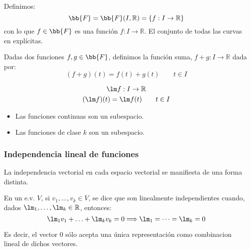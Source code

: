 Definimos:
\begin{equation*}
    \bb{F} = \bb{F}(I, \mathbb{R}) = \{f:I\rightarrow\mathbb{R}\}
\end{equation*}
con lo que $f\in \bb{F}$ es una función $f:I\rightarrow\mathbb{R}$. El conjunto de todas las curvas en explícitas.

\begin{definicion}
    Dadas dos funciones $f,g\in \bb{F}$, definimos la función suma, $f+g:I\rightarrow\mathbb{R}$ dada por:
    \begin{equation*}
        (f+g)(t) = f(t) + g(t) \qquad t\in I
    \end{equation*}
\end{definicion}


\begin{definicion}[]
    \begin{gather*}
        \lm f:I\rightarrow\mathbb{R} \\
        (\lm f)(t) = \lm f(t) \qquad t\in I
    \end{gather*}
\end{definicion}


\begin{prop}
    \begin{itemize}
        \item Las funciones continuas son un subespacio.
        \item Las funciones de clase $k$ son un subespacio.
    \end{itemize}
\end{prop}

\subsubsection{Independencia lineal de funciones}
La independencia vectorial en cada espacio vectorial se manifiesta de una forma distinta.

\begin{definicion}
    En un e.v. $V$, si $v_1,\ldots,v_k \in V$, se dice que son linealmente independientes cuando, dados $\lm_1,\ldots,\lm_k\in \mathbb{R}$, entonces:
    \begin{equation*}
        \lm_1v_1 + \ldots + \lm_k v_k = 0 \Longrightarrow \lm_1 = \cdots = \lm_k = 0
    \end{equation*}
\end{definicion}
Es decir, el vector 0 sólo acepta una única representación como combinacion lineal de dichos vectores.

